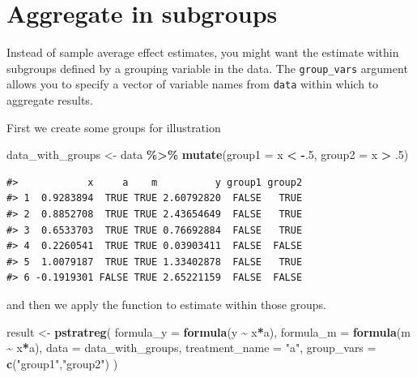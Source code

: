\documentclass[
]{book}
\newenvironment{Shaded}{\begin{snugshade}}{\end{snugshade}}
\newcommand{\AttributeTok}[1]{\textcolor[rgb]{0.13,0.29,0.53}{#1}}
\newcommand{\DecValTok}[1]{\textcolor[rgb]{0.00,0.00,0.81}{#1}}
\newcommand{\FunctionTok}[1]{\textcolor[rgb]{0.13,0.29,0.53}{\textbf{#1}}}
\newcommand{\NormalTok}[1]{#1}
\newcommand{\OtherTok}[1]{\textcolor[rgb]{0.56,0.35,0.01}{#1}}
\newcommand{\SpecialCharTok}[1]{\textcolor[rgb]{0.81,0.36,0.00}{\textbf{#1}}}
\newcommand{\StringTok}[1]{\textcolor[rgb]{0.31,0.60,0.02}{#1}}
\begin{document}
\hypertarget{aggregate-in-subgroups}{%
\section{Aggregate in subgroups}\label{aggregate-in-subgroups}}

Instead of sample average effect estimates, you might want the estimate within subgroups defined by a grouping variable in the data. The \texttt{group\_vars} argument allows you to specify a vector of variable names from \texttt{data} within which to aggregate results.

First we create some groups for illustration

\begin{Shaded}
\begin{Highlighting}[]
\NormalTok{data\_with\_groups }\OtherTok{\textless{}{-}}\NormalTok{ data }\SpecialCharTok{\%\textgreater{}\%}
  \FunctionTok{mutate}\NormalTok{(}\AttributeTok{group1 =}\NormalTok{ x }\SpecialCharTok{\textless{}} \SpecialCharTok{{-}}\NormalTok{.}\DecValTok{5}\NormalTok{,}
         \AttributeTok{group2 =}\NormalTok{ x }\SpecialCharTok{\textgreater{}}\NormalTok{ .}\DecValTok{5}\NormalTok{)}
\end{Highlighting}
\end{Shaded}

\begin{verbatim}
#>            x     a    m          y group1 group2
#> 1  0.9283894  TRUE TRUE 2.60792820  FALSE   TRUE
#> 2  0.8852708  TRUE TRUE 2.43654649  FALSE   TRUE
#> 3  0.6533703  TRUE TRUE 0.76692884  FALSE   TRUE
#> 4  0.2260541  TRUE TRUE 0.03903411  FALSE  FALSE
#> 5  1.0079187  TRUE TRUE 1.33402878  FALSE   TRUE
#> 6 -0.1919301 FALSE TRUE 2.65221159  FALSE  FALSE
\end{verbatim}

and then we apply the function to estimate within those groups.

\begin{Shaded}
\begin{Highlighting}[]
\NormalTok{result }\OtherTok{\textless{}{-}} \FunctionTok{pstratreg}\NormalTok{(}
  \AttributeTok{formula\_y =} \FunctionTok{formula}\NormalTok{(y }\SpecialCharTok{\textasciitilde{}}\NormalTok{ x}\SpecialCharTok{*}\NormalTok{a),}
  \AttributeTok{formula\_m =} \FunctionTok{formula}\NormalTok{(m }\SpecialCharTok{\textasciitilde{}}\NormalTok{ x}\SpecialCharTok{*}\NormalTok{a),}
  \AttributeTok{data =}\NormalTok{ data\_with\_groups,}
  \AttributeTok{treatment\_name =} \StringTok{"a"}\NormalTok{,}
  \AttributeTok{group\_vars =} \FunctionTok{c}\NormalTok{(}\StringTok{"group1"}\NormalTok{,}\StringTok{"group2"}\NormalTok{)}
\NormalTok{)}
\end{Highlighting}
\end{Shaded}
\end{document}
